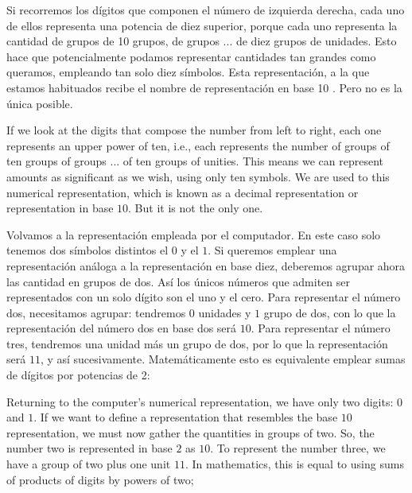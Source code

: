 \begin{paracol}{2}
Si recorremos los dígitos que componen el número de izquierda derecha, cada uno de ellos representa una potencia de diez superior, porque cada uno representa la cantidad de grupos de 10 grupos, de grupos ... de diez grupos de unidades. Esto hace que potencialmente podamos representar cantidades tan grandes como queramos, empleando tan solo diez símbolos. Esta representación, a la que estamos habituados recibe el nombre de representación en base 10 . Pero no es la única posible.

\switchcolumn
If we look at the digits that compose the number from left to right, each one represents an upper power of ten, i.e., each represents the number of groups of ten groups of groups ... of ten groups of unities. This means we can represent amounts as significant as we wish, using only ten symbols. We are used to this numerical representation, which is known as a decimal representation or representation in base $10$. But it is not the only one.   

\switchcolumn
Volvamos a la representación empleada por el computador. En este caso solo tenemos dos símbolos distintos el $0$ y el $1$. Si queremos emplear una representación análoga a la representación en base diez, deberemos agrupar ahora las cantidad en grupos de dos. Así los únicos números que admiten ser representados con un solo dígito son el uno y el cero. Para representar el número dos, necesitamos agrupar: tendremos $0$ unidades y $1$ grupo de dos, con lo que la representación del número dos en base dos será $10$. Para representar el número tres, tendremos una unidad más un grupo de dos, por lo que la representación será $11$, y así sucesivamente. Matemáticamente esto es equivalente emplear sumas de dígitos por potencias de 2:

\switchcolumn
Returning to the computer's numerical representation, we have only two digits: $0$ and $1$. If we want to define a representation that resembles the base $10$ representation, we must now gather the quantities in groups of two. So, the number two is represented in base $2$ as $10$. To represent the number three, we have a group of two plus one unit $11$. In mathematics, this is equal to using sums of products of digits by powers of two;               
\end{paracol}

